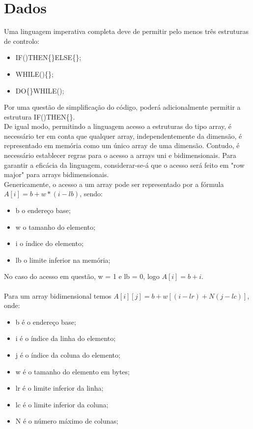 \newpage

\section{Dados}
\label{sec:dados:analise}

Uma linguagem imperativa completa deve de permitir pelo menos três estruturas de controlo:

\begin{itemize}
\item IF()THEN\{\}ELSE\{\};
\item WHILE()\{\};
\item DO\{\}WHILE();
\end{itemize}

Por uma questão de simplificação do código, poderá adicionalmente permitir
a estrutura IF()THEN\{\}.\\

De igual modo, permitindo a linguagem acesso a estruturas do tipo array,
é necessário ter em conta que qualquer array, independentemente da dimensão,
é representado em memória como um único array de uma dimensão. Contudo,
é necessário establecer regras para o acesso a arrays uni e bidimensionais. Para
garantir a eficácia da linguagem, considerar-se-á que o acesso será feito em
"row major" para arrays bidimensionais.\\

Genericamente, o acesso a um array pode ser representado por a fórmula $A[i] = b + w * (i - lb)$, sendo:

\begin{itemize}
\item b o endereço base;
\item w o tamanho do elemento;
\item i o índice do elemento;
\item lb o limite inferior na memória;
\end{itemize}

No caso do acesso em questão, w = 1 e lb = 0, logo $A[i] = b + i$.\\\\

Para um array bidimensional temos $A[i][j] = b + w [(i - lr) + N(j - lc)]$, onde:

\begin{itemize}
\item b é o endereço base;
\item i é o índice da linha do elemento;
\item j é o índice da coluna do elemento;
\item w é o tamanho do elemento em bytes;
\item lr é o limite inferior da linha;
\item lc é o limite inferior da coluna;
\item N é o número máximo de colunas;
\end{itemize}

